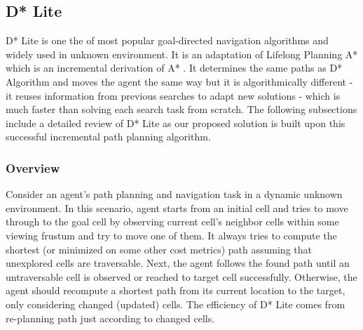 \documentclass[10pt,journal]{IEEEtran}
\begin{document}

\subsection{D* Lite}

D* Lite \cite{Koenig:2002} is one the of most popular goal-directed navigation algorithms and widely used in unknown environment. It is an adaptation of Lifelong Planning A* \cite{LPAStarKoenig:2004} which is an incremental derivation of A* \cite{AStarHart:1968}. It determines the same paths as D* Algorithm \cite{DStar:1994} and moves the agent the same way but it is algorithmically different - it reuses information from previous searches to adapt new solutions - which is much faster than solving each search task from scratch.
The following subsections include a detailed review of D* Lite as our proposed solution is built upon this successful incremental path planning algorithm.

\subsubsection{Overview}

Consider an agent's path planning and navigation task in a dynamic unknown environment. In this scenario, agent starts from an initial cell and tries to move through to the goal cell by observing current cell's neighbor cells within some viewing frustum and try to move one of them. It always tries to compute the shortest (or minimized on some other cost metrics) path assuming that unexplored cells are traversable. Next, the agent follows the found path until an untraversable cell is observed or reached to target cell successfully. Otherwise, the agent should recompute a shortest path from its current location to the target, only considering changed (updated) cells. The efficiency of D* Lite comes from re-planning path just according to changed cells.
\end{document}
